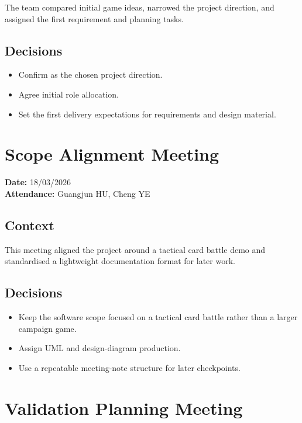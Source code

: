 The team compared initial game ideas, narrowed the project direction, and assigned the first requirement and planning tasks.

\subsection{Decisions}

\begin{itemize}
    \item Confirm \projectname{} as the chosen project direction.
    \item Agree initial role allocation.
    \item Set the first delivery expectations for requirements and design material.
\end{itemize}

\section{Scope Alignment Meeting}

\textbf{Date:} 18/03/2026 \\
\textbf{Attendance:} Guangjun HU, Cheng YE

\subsection{Context}

This meeting aligned the project around a tactical card battle demo and standardised a lightweight documentation format for later work.

\subsection{Decisions}

\begin{itemize}
    \item Keep the software scope focused on a tactical card battle rather than a larger campaign game.
    \item Assign UML and design-diagram production.
    \item Use a repeatable meeting-note structure for later checkpoints.
\end{itemize}

\section{Validation Planning Meeting}

